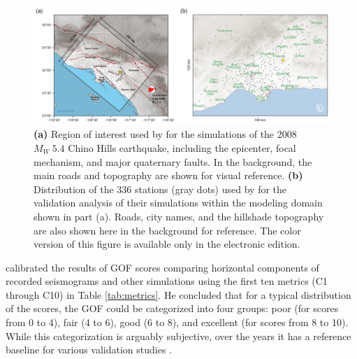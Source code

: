 

\begin{figure}
    \centering
    \includegraphics[width=\textwidth]{figures/pdf/figure-01}
    \caption{\textbf{(a)} Region of interest used by \citet{Taborda_2014_BSSA} for the simulations of the 2008 $M_W ~ 5.4$ Chino Hills earthquake, including the epicenter, focal mechanism, and major quaternary faults. In the background, the main roads and topography are shown for visual reference. \textbf{(b)} Distribution of the 336 stations (gray dots) used by \citet{Taborda_2014_BSSA} for the validation analysis of their simulations within the modeling domain shown in part (a). Roads, city names, and the hillshade topography are also shown here in the background for reference. The color version of this figure is available only in the electronic edition.}
    \label{fig:chino-hills}
\end{figure}

\citet{Anderson_2004_Proc} calibrated the results of GOF scores comparing horizontal components of recorded seismograms and other simulations using the first ten metrics (C1 through C10) in Table \ref{tab:metrics}. He concluded that for a typical distribution of the scores, the GOF could be categorized into four groups: poor (for scores from 0 to 4), fair (4 to 6), good (6 to 8), and excellent (for scores from 8 to 10). While this categorization is arguably subjective, over the years it has  a reference baseline for various validation studies \citep[e.g.,][]{Chaljub_2010_BSSA, Bielak_2010_GJI, Guidotti_2011_SRL, Maufroy_2015_BSSA}.

